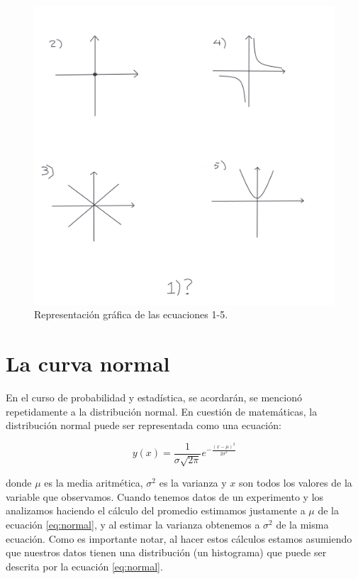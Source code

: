\documentclass[
]{book}
\begin{document}
\begin{figure}

{\centering \includegraphics[width=6.93in]{Unidad-II/conicas} 

}

\caption{Representación gráfica de las ecuaciones 1-5.}\label{fig:conicas}
\end{figure}

\hypertarget{la-curva-normal}{%
\section{La curva normal}\label{la-curva-normal}}

En el curso de probabilidad y estadística, se acordarán, se mencionó repetidamente a la distribución normal. En cuestión de matemáticas, la distribución normal puede ser representada como una ecuación:

\begin{equation}
    y(x) = \frac{1}{\sigma \sqrt{2\pi}}e^{-\frac{(x-\mu)^2}{2\sigma^2}} \label{eq:normal}
\end{equation}

donde \(\mu\) es la media aritmética, \(\sigma^2\) es la varianza y \(x\) son todos los valores de la variable que observamos. Cuando tenemos datos de un experimento y los analizamos haciendo el cálculo del promedio estimamos justamente a \(\mu\) de la ecuación \eqref{eq:normal}, y al estimar la varianza obtenemos a \(\sigma^2\) de la misma ecuación. Como es importante notar, al hacer estos cálculos estamos asumiendo que nuestros datos tienen una distribución (un histograma) que puede ser descrita por la ecuación \eqref{eq:normal}.
\end{document}
